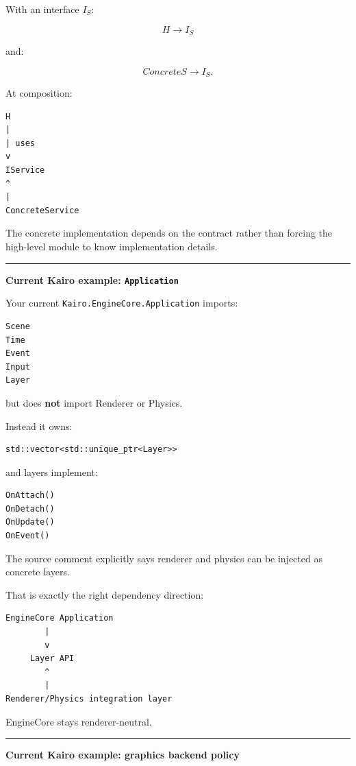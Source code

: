 With an interface \(I_S\):

\[
H\rightarrow I_S
\]

and:

\[
ConcreteS\rightarrow I_S.
\]

At composition:

\begin{verbatim}
H
|
| uses
v
IService
^
|
ConcreteService
\end{verbatim}

The concrete implementation depends on the contract rather than forcing the high-level module to know implementation details.

\begin{center}\rule{0.5\linewidth}{0.5pt}\end{center}

\textbf{Current Kairo example: \texttt{Application}}

Your current \texttt{Kairo.EngineCore.Application} imports:

\begin{verbatim}
Scene
Time
Event
Input
Layer
\end{verbatim}

but does \textbf{not} import Renderer or Physics.

Instead it owns:

\begin{verbatim}
std::vector<std::unique_ptr<Layer>>
\end{verbatim}

and layers implement:

\begin{verbatim}
OnAttach()
OnDetach()
OnUpdate()
OnEvent()
\end{verbatim}

The source comment explicitly says renderer and physics can be injected as concrete layers.

That is exactly the right dependency direction:

\begin{verbatim}
EngineCore Application
        |
        v
     Layer API
        ^
        |
Renderer/Physics integration layer
\end{verbatim}

EngineCore stays renderer-neutral.

\begin{center}\rule{0.5\linewidth}{0.5pt}\end{center}

\textbf{Current Kairo example: graphics backend policy}

